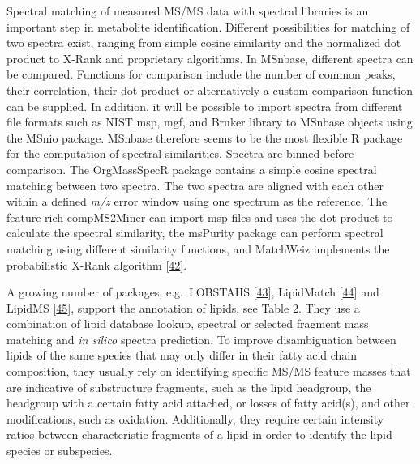 \documentclass[]{article}
\begin{document}
Spectral matching of measured MS/MS data with spectral libraries is an important step in metabolite identification. Different possibilities for matching of two spectra exist, ranging from simple cosine similarity and the normalized dot product to X-Rank and proprietary algorithms. In MSnbase, different spectra can be compared. Functions for comparison include the number of common peaks, their correlation, their dot product or alternatively a custom comparison function can be supplied. In addition, it will be possible to import spectra from different file formats such as NIST msp, mgf, and Bruker library to MSnbase objects using the MSnio package. MSnbase therefore seems to be the most flexible R package for the computation of spectral similarities. Spectra are binned before comparison. The OrgMassSpecR package contains a simple cosine spectral matching between two spectra. The two spectra are aligned with each other within a defined \emph{m/z} error window using one spectrum as the reference. The feature-rich compMS2Miner can import msp files and uses the dot product to calculate the spectral similarity, the msPurity package can perform spectral matching using different similarity functions, and MatchWeiz implements the probabilistic X-Rank algorithm {[}\protect\hyperlink{ref-mylonas_2009}{42}{]}.

A growing number of packages, e.g.~LOBSTAHS {[}\protect\hyperlink{ref-collins_2016}{43}{]}, LipidMatch {[}\protect\hyperlink{ref-koelmel_2017}{44}{]} and LipidMS {[}\protect\hyperlink{ref-alcorizabalaguer_2018}{45}{]}, support the annotation of lipids, see Table 2. They use a combination of lipid database lookup, spectral or selected fragment mass matching and \emph{in silico} spectra prediction. To improve disambiguation between lipids of the same species that may only differ in their fatty acid chain composition, they usually rely on identifying specific MS/MS feature masses that are indicative of substructure fragments, such as the lipid headgroup, the headgroup with a certain fatty acid attached, or losses of fatty acid(s), and other modifications, such as oxidation. Additionally, they require certain intensity ratios between characteristic fragments of a lipid in order to identify the lipid species or subspecies.
\end{document}
